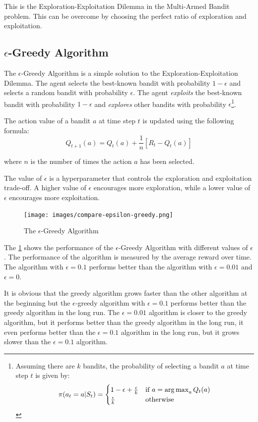 This is the Exploration-Exploitation Dilemma in the Multi-Armed Bandit problem. This can be overcome by choosing the perfect ratio of exploration and exploitation.

\subsection{$\epsilon$-Greedy Algorithm}

The $\epsilon$-Greedy Algorithm is a simple solution to the Exploration-Exploitation Dilemma. The agent selects the best-known bandit with probability $1-\epsilon$ and selects a random bandit with probability $\epsilon$. The agent \textit{exploits} the best-known bandit with probability $1-\epsilon$ and \textit{explores} other bandits with probability $\epsilon$\footnote{Assuming there are $k$ bandits, the probability of selecting a bandit $a$ at time step $t$ is given by:
\[\pi(a_t=a|S_t) = \begin{cases}
    1-\epsilon + \frac{\epsilon}{k} & \text{if } a = \operatorname*{arg\,max}_{a} Q_t(a) \\ \frac{\epsilon}{k} & \text{otherwise}
\end{cases}\]}.

The action value of a bandit $a$ at time step $t$ is updated using the following formula:
\[Q_{t+1}(a) = Q_t(a) + \frac{1}{n}[R_t - Q_t(a)]\]

where $n$ is the number of times the action $a$ has been selected.

The value of $\epsilon$ is a hyperparameter that controls the exploration and exploitation trade-off. A higher value of $\epsilon$ encourages more exploration, while a lower value of $\epsilon$ encourages more exploitation.

\begin{figure}[h!]
    \centering
    \texttt{[image: images/compare-epsilon-greedy.png]}
    \caption{The $\epsilon$-Greedy Algorithm}
    \label{fig:epsilon_greedy}
\end{figure}

The \ref{fig:epsilon_greedy} shows the performance of the $\epsilon$-Greedy Algorithm with different values of $\epsilon$. The performance of the algorithm is measured by the average reward over time. The algorithm with $\epsilon=0.1$ performs better than the algorithm with $\epsilon=0.01$ and $\epsilon=0$.

It is obvious that the greedy algorithm grows faster than the other algorithm at the beginning but the $\epsilon$-greedy algorithm with $\epsilon=0.1$ performs better than the greedy algorithm in the long run. The $\epsilon=0.01$ algorithm is closer to the greedy algorithm, but it performs better than the greedy algorithm in the long run, it even performs better than the $\epsilon=0.1$ algorithm in the long run, but it grows slower than the $\epsilon=0.1$ algorithm.

